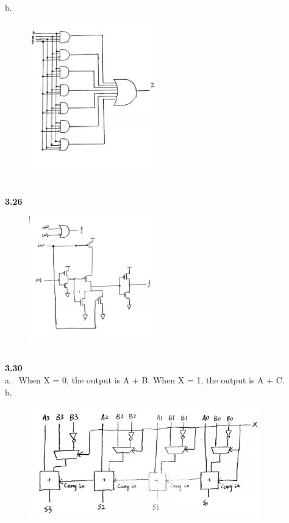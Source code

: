 \documentclass[a4paper,12pt]{article}     %
\begin{document}
\newpage
b. \ \begin{figure}[h] \includegraphics[width = 0.5\textwidth]{../fig/3.23.b.jpeg} \end{figure}\\

\newpage
\textbf{3.26}\\
\begin{figure}[h] \includegraphics[width = 0.5\textwidth]{../fig/3.26.jpeg} \end{figure}\\

\textbf{3.30}\\
a. \ When X = 0, the output is A + B. When X = 1, the output is A + C.\\
b. \ \begin{figure}[h] \includegraphics[width = 0.9\textwidth]{../fig/3.30.jpeg} \end{figure}
\end{document}
